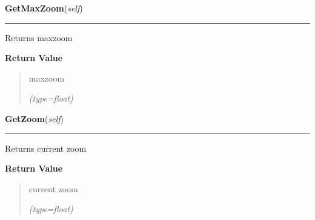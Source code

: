     \label{ImagePanel:ImagePanel:GetMaxZoom}

    \vspace{0.5ex}

\hspace{.8\funcindent}\begin{boxedminipage}{\funcwidth}

    \raggedright \textbf{GetMaxZoom}(\textit{self})

    \vspace{-1.5ex}

    \rule{\textwidth}{0.5\fboxrule}
\setlength{\parskip}{2ex}
    Returns maxzoom

\setlength{\parskip}{1ex}
      \textbf{Return Value}
    \vspace{-1ex}

      \begin{quote}
      maxzoom

      {\it (type=float)}

      \end{quote}

    \end{boxedminipage}

    \label{ImagePanel:ImagePanel:GetZoom}

    \vspace{0.5ex}

\hspace{.8\funcindent}\begin{boxedminipage}{\funcwidth}

    \raggedright \textbf{GetZoom}(\textit{self})

    \vspace{-1.5ex}

    \rule{\textwidth}{0.5\fboxrule}
\setlength{\parskip}{2ex}
    Returns current zoom

\setlength{\parskip}{1ex}
      \textbf{Return Value}
    \vspace{-1ex}

      \begin{quote}
      current zoom

      {\it (type=float)}

      \end{quote}

    \end{boxedminipage}

